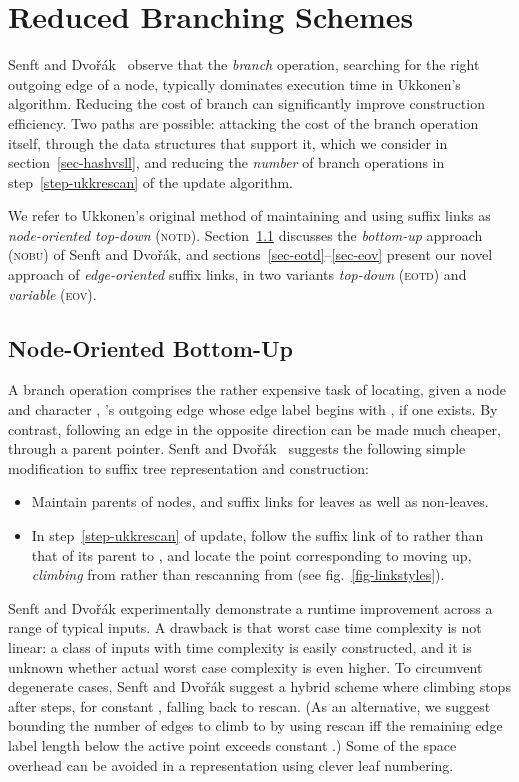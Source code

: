 \documentclass{llncs}
\newcommand\notd{\textsc{notd}\xspace}
\newcommand\nobu{\textsc{nobu}\xspace}
\newcommand\eotd{\textsc{eotd}\xspace}
\newcommand\eov{\textsc{eov}\xspace}
\begin{document}
\section{Reduced Branching Schemes}\label{sec-redbranch}

Senft and Dvořák~\cite{SenftBranching} observe that the \emph{branch} operation,
searching for the right outgoing edge of a node, typically dominates execution
time in Ukkonen's algorithm. Reducing the cost of branch can significantly improve
construction efficiency. Two paths are possible: attacking the cost of the
branch operation itself, through the data structures that support it, which
we consider in section~\ref{sec-hashvsll}, and reducing the \emph{number}
of branch operations in step~\ref{step-ukkrescan} of
the update algorithm.

We refer to Ukkonen's original method of maintaining and using suffix links as
\emph{node-oriented top-down} (\notd). Section~\ref{sec-nobu} discusses the
\emph{bottom-up} approach (\nobu) of Senft and Dvořák, and
sections~\ref{sec-eotd}--\ref{sec-eov} present our novel approach of
\emph{edge-oriented} suffix links, in two variants \emph{top-down} (\eotd) and
\emph{variable} (\eov).

\subsection{Node-Oriented Bottom-Up}\label{sec-nobu}

A branch operation comprises the rather expensive task of locating, given a
node  and character , 's outgoing
edge whose edge label begins with , if one exists. By contrast, following an
edge in the opposite direction can be made much cheaper, through a parent pointer. Senft and Dvořák~\cite{SenftBranching}
suggests the following simple modification to suffix tree representation and
construction:
\begin{itemize}
\item Maintain parents of nodes, and suffix links for
  leaves as well as non-leaves.
\item In step~\ref{step-ukkrescan} of
update, follow the suffix link of  to  rather than that of its
parent  to , and locate the point corresponding to  moving up,
\emph{climbing} from 
rather than rescanning from  (see fig.~\ref{fig-linkstyles}).
\end{itemize}

Senft and Dvořák experimentally demonstrate a runtime improvement across a
range of typical inputs. A drawback is that worst case time complexity is
not linear: a class of inputs with time complexity  is
easily constructed, and it is unknown whether actual worst case
complexity is even higher. To circumvent degenerate cases, Senft and Dvořák
suggest a hybrid scheme where climbing stops after  steps, for constant , falling back to rescan. (As an alternative, we
suggest bounding the number of edges to climb to by using rescan iff the remaining edge label length below the active point
exceeds constant .) Some of the space overhead can be avoided in a representation using clever
leaf numbering.
\end{document}
